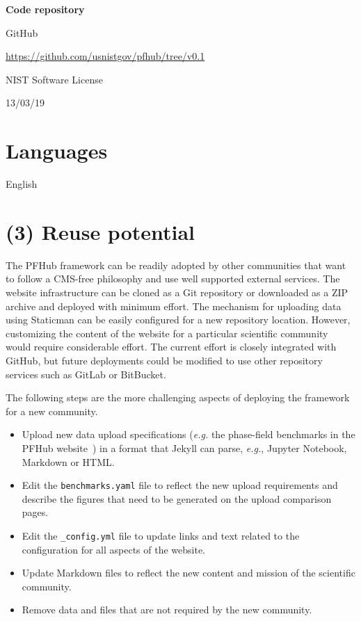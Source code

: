 \documentclass{jors}
\begin{document}
{\bf Code repository}

\begin{description}[noitemsep,topsep=0pt]
	\item[Name:] GitHub
	\item[Persistent identifier:] \url{https://github.com/usnistgov/pfhub/tree/v0.1}
	\item[Licence:] NIST Software License~\cite{nistlicense}
	\item[Date published:] 13/03/19
\end{description}

\section*{Languages}

English

\section*{(3) Reuse potential}

The PFHub framework can be readily adopted by other communities that
want to follow a CMS-free philosophy and use well supported external
services. The website infrastructure can be cloned as a Git repository
or downloaded as a ZIP archive and deployed with minimum effort. The
mechanism for uploading data using Staticman can be easily configured
for a new repository location. However, customizing the content of the
website for a particular scientific community would require
considerable effort. The current effort is closely integrated with
GitHub, but future deployments could be modified to use other
repository services such as GitLab or BitBucket.

The following steps are the more challenging
aspects of deploying the framework for a new community.

\begin{itemize}
  \item Upload new data upload specifications (\emph{e.g.} the
    phase-field benchmarks in the PFHub website~\cite{pfhub}) in a
    format that Jekyll can parse, \emph{e.g.}, Jupyter Notebook,
    Markdown or HTML.
  \item Edit the \texttt{benchmarks.yaml} file to reflect the new
    upload requirements and describe the figures that need to be
    generated on the upload comparison pages.
  \item Edit the \texttt{\_config.yml} file to update links and text
    related to the configuration for all aspects of the website.
  \item Update Markdown files to reflect the new content and mission
    of the scientific community.
  \item Remove data and files that are not required by the new
    community.
\end{itemize}
\end{document}
